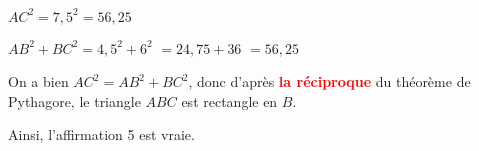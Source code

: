 \begin{minipage}{6cm}
$AC^2 = 7,5^2 = 56,25$
\end{minipage}
\vline \hspace{1cm}\begin{minipage}{6cm}
$AB^2+BC^2 = 4,5^2+6^2$
$=24,75+36$
$=56,25$
\end{minipage}

\vspace{0.1cm}

On a bien \quad $AC^2=AB^2+BC^2$, donc d'après \textcolor{red}{\textbf{la réciproque}} du théorème de Pythagore, le triangle $ABC$ est rectangle en $B$.

Ainsi, l'affirmation 5 est vraie.

\vspace{0.5cm}

